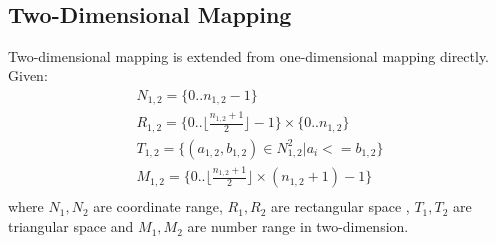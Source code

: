 \documentclass[AMA,LATO1COL]{WileyNJD-v2}
\begin{document}
\begin{table}[!ht]
  \centering
  \\
  \caption{Example: Interval Transformation for even/odd number of points }\label{maptable}
\end{table}

\subsection{Two-Dimensional Mapping}
Two-dimensional mapping is extended from one-dimensional mapping directly.
\\Given:
\begin{eqnarray}
& N_{1,2} = \{0..n_{1,2}-1\}          & \\
& R_{1,2} = \{0..\lfloor \frac{n_{1,2}+1}{2}\rfloor-1\} \times \{0..n_{1,2}\}&\\
& T_{1,2} = \{(a_{1,2},b_{1,2}) \in  N_{1,2}^2 | a_i<=b_{1,2}\}&\\
& M_{1,2} = \{0.. \lfloor \frac{n_{1,2}+1}{2}\rfloor \times (n_{1,2}+1)-1\}&\\
\end{eqnarray}
where $N_1,N_2$ are coordinate range, $R_1, R_2$ are rectangular space , $T_1,T_2$ are triangular space  and $M_1,M_2$ are number range in two-dimension.\\
\end{document}
